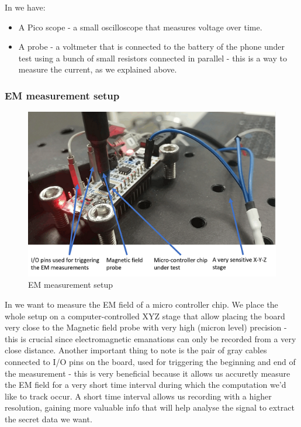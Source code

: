 In  we have:
\begin{itemize}
    \item A Pico scope - a small oscilloscope that measures voltage over time.
    \item A probe - a voltmeter that is connected to the battery of the phone under test using a bunch of small resistors connected in parallel - this is a way to measure the current, as we explained above.
\end{itemize}

\subsubsection{EM measurement setup}
\begin{figure}[!ht]
    \centering
    \includegraphics[width=1.0\linewidth]{images/chapter4/em_measurement_setup.png}
    \caption{EM measurement setup} \label{fig:em_measurement_setup}
\end{figure}

In  we want to measure the EM field of a micro controller chip. We place the whole setup on a computer-controlled XYZ stage that allow placing the board very close to the Magnetic field probe with very high (micron level) precision - this is crucial since electromagnetic emanations can only be recorded from a very close distance. Another important thing to note is the pair of gray cables connected to I/O pins on the board, used for triggering the beginning and end of the measurement - this is very beneficial because it allows us accuretly measure the EM field for a very short time interval during which the computation we'd like to track occur. A short time interval allows us recording with a higher resolution, gaining more valuable info that will help analyse the signal to extract the secret data we want.

